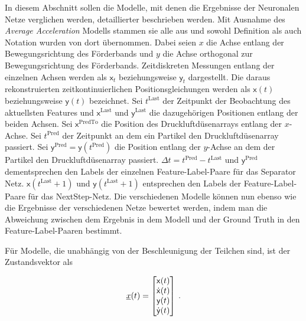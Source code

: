 In diesem Abschnitt sollen die Modelle, mit denen die Ergebnisse der Neuronalen Netze verglichen werden, detaillierter beschrieben werden.
Mit Ausnahme des \textit{Average Acceleration} Modells stammen sie alle aus \cite{Pfaff2018} und sowohl Definition als auch Notation wurden von dort übernommen.
Dabei seien \(x\) die Achse entlang der Bewegungsrichtung des Förderbands und \(y\) die Achse orthogonal zur Bewegungsrichtung des Förderbands.
Zeitdiskreten Messungen entlang der einzelnen Achsen werden als \(\mathsf{x}_t\) beziehungsweise \(\mathsf{y}_t\) dargestellt.
Die daraus rekonstruierten zeitkontinuierlichen Positionsgleichungen werden als \(\mathsf{x}(t)\) beziehungsweise \(\mathsf{y}(t)\) bezeichnet.
Sei \(t^{\text{Last}}\) der Zeitpunkt der Beobachtung des aktuellsten Features und \(\mathsf{x}^{\text{Last}}\) und \(\mathsf{y}^{\text{Last}}\) die dazugehörigen Positionen entlang der beiden Achsen.
Sei \(\mathsf{x}^{\text{PredTo}}\) die Position des Druckluftdüsenarrays entlang der \(x\)-Achse.
Sei \(t^{\text{Pred}}\) der Zeitpunkt an dem ein Partikel den Druckluftdüsenarray passiert.
Sei \(\mathsf{y}^{\text{Pred}} = \mathsf{y}(t^{\text{Pred}})\) die Position entlang der \(y\)-Achse an dem der Partikel den Druckluftdüsenarray passiert.
\(\Delta t = t^{\text{Pred}} - t^{\text{Last}} \) und \(\mathsf{y}^{\text{Pred}}\) dementsprechen den Labels der einzelnen Feature-Label-Paare für das Separator Netz.
\(\mathsf{x}(t^{\text{Last}} + 1)\) und \(\mathsf{y}(t^{\text{Last}} + 1)\) entsprechen den Labels der Feature-Label-Paare für das NextStep-Netz.
Die verschiedenen Modelle können nun ebenso wie die Ergebnisse der verschiedenen Netze bewertet werden, 
indem man die Abweichung zwischen dem Ergebnis in dem Modell und der Ground Truth in den Feature-Label-Paaren bestimmt.


Für Modelle, die unabhängig von der Beschleunigung der Teilchen sind, ist der Zustandsvektor als 

\begin{equation} \label{eq:definitionCV}
    {\underline{x}}(t) = 
    \begin{bmatrix}
        \mathsf{x}(t) \\
        \dot{\mathsf{x}}(t) \\
        \mathsf{y}(t) \\
        \dot{\mathsf{y}}(t)
       \end{bmatrix} \: .
\end{equation}

